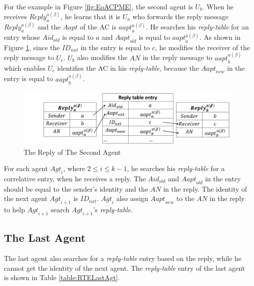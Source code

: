 For the example in Figure \ref{fig:EoACPME}, the second agent is $U_b$. When he receives ${Reply}^{a\left(\beta\right)}_a$, he learns that it is $U_a$ who forwards the reply message ${Reply}^{a\left(\beta\right)}_a$ and the $Aapt$ of the AC is ${aapt}^{a\left(\beta\right)}_a$. He searches his \textit{reply-table} for an entry whose ${Aid}_{old}$ is equal to $a$ and ${Aapt}_{old}$ is equal to ${aapt}^{a\left(\beta\right)}_a$. As shown in Figure \ref{fig:ReplyOfSecondAgent}, since the ${ID}_{nxt}$ in the entry is equal to $c$, he modifies the receiver of the reply message to $U_c$. $U_b$ also modifies the $AN$ in the reply message to ${aapt}^{a\left(\beta\right)}_b$ which enables $U_c$ identifies the AC in his \textit{reply-table}, because the ${Aapt}_{new}$ in the entry is equal to ${aapt}^{a\left(\beta\right)}_b$. 

\begin{figure} [H]
  \centering 
  \includegraphics[width=6.0in]{figures/FIG_4_8_The_Reply_of_the_Second_Agent.png}
  \caption{The Reply of The Second Agent} 
  \label{fig:ReplyOfSecondAgent} %
\end{figure}

For each agent ${Agt}_i$, where $2\le i\le k-1$, he searches his \textit{reply-table} for a correlative entry, when he receives a reply. The ${Aid}_{old}$ and ${Aapt}_{old}$ in the entry should be equal to the sender's identity and the $AN$ in the reply. The identity of the next agent ${Agt}_{i+1}$ is ${ID}_{nxt}$. ${Agt}_i$ also assign ${Aapt}_{new}$ to the $AN$ in the reply to help ${Agt}_{i+1}$ search ${Agt}_{i+1}$'s \textit{reply-table}.

\subsection{ The Last Agent}

\noindent The last agent also searches for a \textit{reply-table} entry based on the reply, while he cannot get the identity of the next agent. The \textit{reply-table} entry of the last agent is shown in Table \ref{table:RTELastAgt}.

